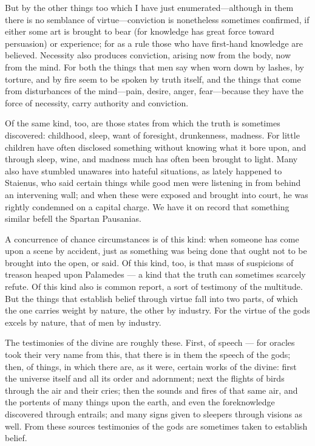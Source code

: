 But by the other things too which I have just enumerated—although in them there is no semblance of virtue—conviction is nonetheless sometimes confirmed, if either some art is brought to bear (for knowledge has great force toward persuasion) or experience; for as a rule those who have first-hand knowledge are believed. Necessity also produces conviction, arising now from the body, now from the mind. For both the things that men say when worn down by lashes, by torture, and by fire seem to be spoken by truth itself, and the things that come from disturbances of the mind—pain, desire, anger, fear—because they have the force of necessity, carry authority and conviction.

 Of the same kind, too, are those states from which the truth is sometimes discovered: childhood, sleep, want of foresight, drunkenness, madness. For little children have often disclosed something without knowing what it bore upon, and through sleep, wine, and madness much has often been brought to light. Many also have stumbled unawares into hateful situations, as lately happened to Staienus, who said certain things while good men were listening in from behind an intervening wall; and when these were exposed and brought into court, he was rightly condemned on a capital charge. We have it on record that something similar befell the Spartan Pausanias.

 A concurrence of chance circumstances is of this kind: when someone has come upon a scene by accident, just as something was being done that ought not to be brought into the open, or said. Of this kind, too, is that mass of suspicions of treason heaped upon Palamedes — a kind that the truth can sometimes scarcely refute. Of this kind also is common report, a sort of testimony of the multitude. But the things that establish belief through virtue fall into two parts, of which the one carries weight by nature, the other by industry. For the virtue of the gods excels by nature, that of men by industry.

 The testimonies of the divine are roughly these. First, of speech — for oracles took their very name from this, that there is in them the speech of the gods; then, of things, in which there are, as it were, certain works of the divine: first the universe itself and all its order and adornment; next the flights of birds through the air and their cries; then the sounds and fires of that same air, and the portents of many things upon the earth, and even the foreknowledge discovered through entrails; and many signs given to sleepers through visions as well. From these sources testimonies of the gods are sometimes taken to establish belief.

